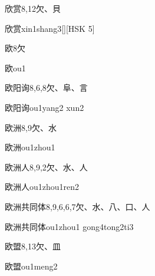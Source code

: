 \begin{Entry}{欣赏}{8,12}{⽋、⾙}
  \begin{Phonetics}{欣赏}{xin1shang3}[][HSK 5]
  \end{Phonetics}
\end{Entry}

\begin{Entry}{欧}{8}{⽋}
  \begin{Phonetics}{欧}{ou1}
  \end{Phonetics}
\end{Entry}

\begin{Entry}{欧阳询}{8,6,8}{⽋、⾩、⾔}
  \begin{Phonetics}{欧阳询}{ou1yang2 xun2}
  \end{Phonetics}
\end{Entry}

\begin{Entry}{欧洲}{8,9}{⽋、⽔}
  \begin{Phonetics}{欧洲}{ou1zhou1}
  \end{Phonetics}
\end{Entry}

\begin{Entry}{欧洲人}{8,9,2}{⽋、⽔、⼈}
  \begin{Phonetics}{欧洲人}{ou1zhou1ren2}
  \end{Phonetics}
\end{Entry}

\begin{Entry}{欧洲共同体}{8,9,6,6,7}{⽋、⽔、⼋、⼝、⼈}
  \begin{Phonetics}{欧洲共同体}{ou1zhou1 gong4tong2ti3}
  \end{Phonetics}
\end{Entry}

\begin{Entry}{欧盟}{8,13}{⽋、⽫}
  \begin{Phonetics}{欧盟}{ou1meng2}
  \end{Phonetics}
\end{Entry}

